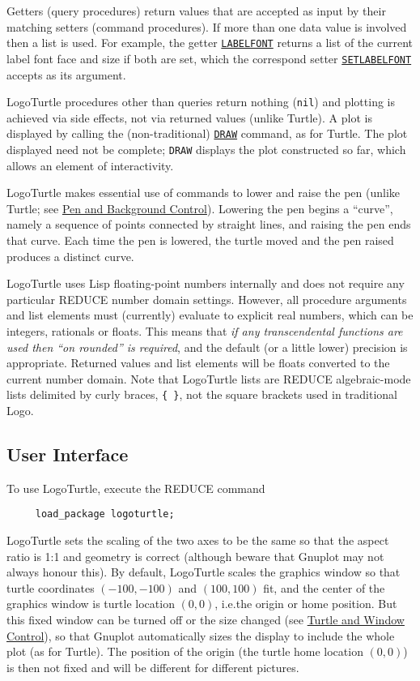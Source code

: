 Getters (query procedures) return values that are accepted as input by
their matching setters (command procedures).  If more than one data
value is involved then a list is used.  For example, the getter
\hyperref[logoturtle:labelfont]{\texttt{LABELFONT}} returns a list of
the current label font face and size if both are set, which the
correspond setter
\hyperref[logoturtle:setlabelfont]{\texttt{SETLABELFONT}} accepts as
its argument.

LogoTurtle procedures other than queries return nothing (\texttt{nil})
and plotting is achieved via side effects, not via returned values
(unlike Turtle).  A plot is displayed by calling the (non-traditional)
\hyperref[logoturtle:draw]{\texttt{DRAW}} command, as for Turtle.
The plot displayed need not be complete; \texttt{DRAW} displays the
plot constructed so far, which allows an element of interactivity.

LogoTurtle makes essential use of commands to lower and raise the pen
(unlike Turtle; see \hyperref[logoturtle:PBC]{Pen and Background
  Control}).  Lowering the pen begins a ``curve'', namely a sequence
of points connected by straight lines, and raising the pen ends that
curve.  Each time the pen is lowered, the turtle moved and the pen
raised produces a distinct curve.

LogoTurtle uses Lisp floating-point numbers internally and does not
require any particular REDUCE number domain settings.  However, all
procedure arguments and list elements must (currently) evaluate to
explicit real numbers, which can be integers, rationals or floats.
This means that \emph{if any transcendental functions are used then
``on rounded'' is required}, and the default (or a little lower)
precision is appropriate.  Returned values and list elements will be
floats converted to the current number domain.  Note that LogoTurtle
lists are REDUCE algebraic-mode lists delimited by curly braces,
\texttt{\{~\}}, not the square brackets used in traditional Logo.


\subsection{User Interface}

To use LogoTurtle, execute the REDUCE command
\begin{verbatim}
     load_package logoturtle;
\end{verbatim}

LogoTurtle sets the scaling of the two axes to be the same so that the
aspect ratio is 1:1 and geometry is correct (although beware that
Gnuplot may not always honour this).  By default, LogoTurtle scales
the graphics window so that turtle coordinates $(-100,-100)$ and
$(100,100)$ fit, and the center of the graphics window is turtle
location $(0,0)$, i.e.\@ the origin or home position.  But this fixed
window can be turned off or the size changed (see
\hyperref[logoturtle:TWC]{Turtle and Window Control}), so that Gnuplot
automatically sizes the display to include the whole plot (as for
Turtle).  The position of the origin (the turtle home location
$(0,0)$) is then not fixed and will be different for different
pictures.

